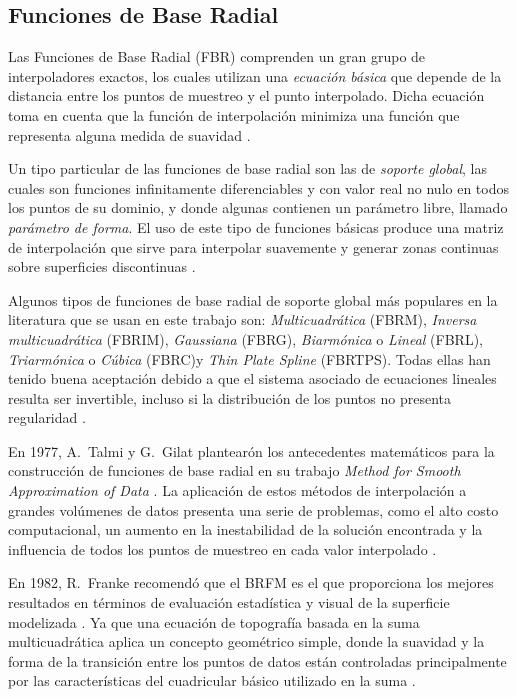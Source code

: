 \subsection{Funciones de Base Radial}
Las Funciones de Base Radial (FBR) comprenden un gran grupo de interpoladores exactos, los cuales utilizan una \textit{ecuación básica} que depende de la distancia entre los puntos de muestreo y el punto interpolado. Dicha ecuación toma en cuenta que la función de interpolación minimiza una función que representa alguna medida de suavidad \citep{aguilar}.

Un tipo particular de las funciones de base radial son las de \textit{soporte global}, las cuales son funciones infinitamente diferenciables y con valor real no nulo en todos los puntos de su dominio, y donde algunas contienen un parámetro libre, llamado \textit{parámetro de forma}. El uso de este tipo de funciones básicas produce una matriz de interpolación que sirve para interpolar suavemente y generar zonas continuas sobre superficies discontinuas \citep{arias}.

Algunos tipos de funciones de base radial de soporte global más populares en la literatura que se usan en este trabajo son: \textit{Multicuadrática} (FBRM), \textit{Inversa multicuadrática} (FBRIM), \textit{Gaussiana} (FBRG), \textit{Biarmónica} o \textit{Lineal} (FBRL), \textit{Triarmónica} o \textit{Cúbica} (FBRC)y \textit{Thin Plate Spline} (FBRTPS). Todas ellas han tenido buena aceptación debido a que el sistema asociado de ecuaciones lineales resulta ser invertible, incluso si la distribución de los puntos no presenta regularidad \citep{arias}.

En 1977, A.\ Talmi y G.\ Gilat plantearón los antecedentes matemáticos para la construcción de funciones de base radial en su trabajo \textit{Method for Smooth Approximation of Data} \citep{talmi}. La aplicación de estos métodos de interpolación a grandes volúmenes de datos presenta una serie de problemas, como el alto costo computacional, un aumento en la inestabilidad de la solución encontrada y la influencia de todos los puntos de muestreo en cada valor interpolado \citep{lazzaro}.

En 1982, R.\ Franke recomendó que el BRFM es el que proporciona los mejores resultados en términos de evaluación estadística y visual de la superficie modelizada \citep{franke}. Ya que una ecuación de topografía basada en la suma multicuadrática aplica un concepto geométrico simple, donde la suavidad y la forma de la transición entre los puntos de datos están controladas principalmente por las características del cuadricular básico utilizado en la suma \citep{hardy}.

